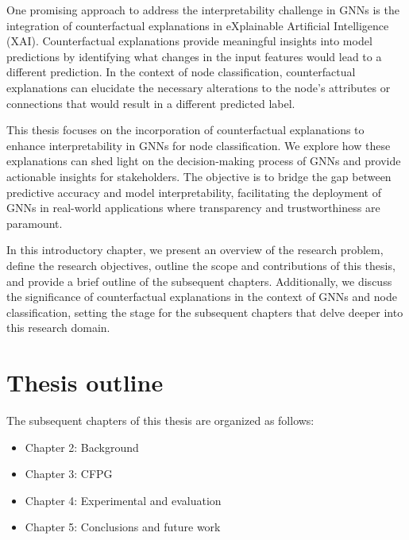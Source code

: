 \documentclass[binding=0.6cm]{sapthesis}
\begin{document}
One promising approach to address the interpretability challenge in GNNs is the integration of counterfactual explanations in eXplainable Artificial Intelligence (XAI\footnotemark). Counterfactual explanations provide meaningful insights into model predictions by identifying what changes in the input features would lead to a different prediction. In the context of node classification, counterfactual explanations can elucidate the necessary alterations to the node's attributes or connections that would result in a different predicted label.



This thesis focuses on the incorporation of counterfactual explanations to enhance interpretability in GNNs for node classification. We explore how these explanations can shed light on the decision-making process of GNNs and provide actionable insights for stakeholders. The objective is to bridge the gap between predictive accuracy and model interpretability, facilitating the deployment of GNNs in real-world applications where transparency and trustworthiness are paramount.

In this introductory chapter, we present an overview of the research problem, define the research objectives, outline the scope and contributions of this thesis, and provide a brief outline of the subsequent chapters. Additionally, we discuss the significance of counterfactual explanations in the context of GNNs and node classification, setting the stage for the subsequent chapters that delve deeper into this research domain.

\section{Thesis outline}
The subsequent chapters of this thesis are organized as follows:
\begin{itemize}
    \item Chapter 2: Background
    \item Chapter 3: CFPG
    \item Chapter 4: Experimental and evaluation
    \item Chapter 5: Conclusions and future work
\end{itemize}
\end{document}
